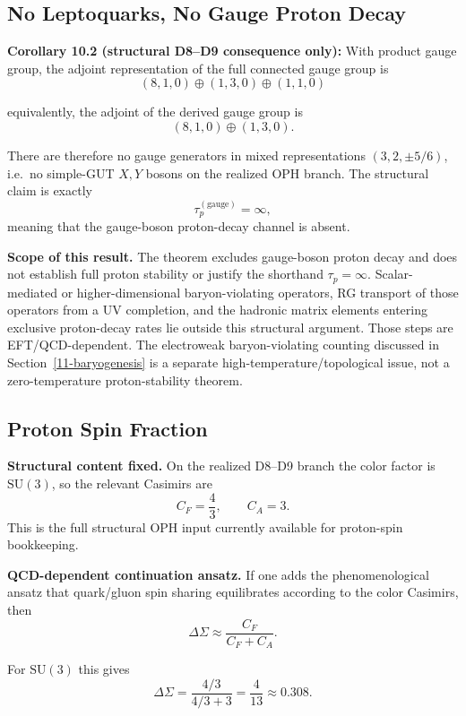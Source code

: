 \subsection{No Leptoquarks, No Gauge Proton Decay}\label{102-no-leptoquarks-no-gauge-proton-decay}

\textbf{Corollary 10.2 (structural D8--D9 consequence only):} With product gauge group, the adjoint representation of the full connected gauge group is \[(8,1,0) \oplus (1,3,0) \oplus (1,1,0)\]

equivalently, the adjoint of the derived gauge group is
\[
(8,1,0) \oplus (1,3,0).
\]

There are therefore no gauge generators in mixed representations \((3,2,\pm 5/6)\), i.e.\ no simple-GUT \(X,Y\) bosons on the realized OPH branch. The structural claim is exactly
\[
\tau_p^{(\text{gauge})} = \infty,
\]
meaning that the gauge-boson proton-decay channel is absent.

\textbf{Scope of this result.} The theorem excludes gauge-boson proton decay and does not establish full proton stability or justify the shorthand \(\tau_p=\infty\). Scalar-mediated or higher-dimensional baryon-violating operators, RG transport of those operators from a UV completion, and the hadronic matrix elements entering exclusive proton-decay rates lie outside this structural argument. Those steps are EFT/QCD-dependent. The electroweak baryon-violating counting discussed in Section~\ref{11-baryogenesis} is a separate high-temperature/topological issue, not a zero-temperature proton-stability theorem.

\subsection{Proton Spin Fraction}\label{103-proton-spin-fraction}

\textbf{Structural content fixed.} On the realized D8--D9 branch the color factor is \(\mathrm{SU}(3)\), so the relevant Casimirs are
\[
C_F=\frac43,\qquad C_A=3.
\]
This is the full structural OPH input currently available for proton-spin bookkeeping.

\textbf{QCD-dependent continuation ansatz.} If one adds the phenomenological ansatz that quark/gluon spin sharing equilibrates according to the color Casimirs, then
\[
\Delta\Sigma \approx \frac{C_F}{C_F + C_A}.
\]

For \(\mathrm{SU}(3)\) this gives
\[
\Delta\Sigma = \frac{4/3}{4/3 + 3} = \frac{4}{13} \approx 0.308.
\]

